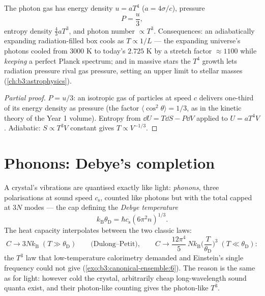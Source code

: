 \begin{proposition}\label{prop:b3:photons-phonons:thermo}
The photon gas has energy density $u = aT^4$ ($a =
4\sigma/c$), pressure
\[
P = \frac u3 ,
\]
entropy density $\tfrac43 aT^3$, and photon number $\propto T^3$.
Consequences: an adiabatically expanding radiation-filled box
cools as $T \propto 1/L$ --- the expanding universe's photons
cooled from $3000$ K to today's $2.725$ K by a stretch factor
$\approx1100$ while \emph{keeping} a perfect Planck spectrum; and
in massive stars the $T^4$ growth lets radiation pressure rival
gas pressure, setting an upper limit to stellar masses
(\cref{ch:b3:astrophysics}).
\end{proposition}

\begin{proof}[Partial proof]
$P = u/3$: an isotropic gas of particles at speed $c$ delivers
one-third of its energy density as pressure (the factor $\langle
\cos^2\theta\rangle = 1/3$, as in the kinetic theory of the Year 1
volume). Entropy from $\dd U = T\dd S - P\dd V$ applied to $U =
aT^4V$. Adiabatic: $S \propto T^3V$ constant gives $T \propto
V^{-1/3}$.
\end{proof}

\section{Phonons: Debye's completion}

\begin{theorem}\label{thm:b3:photons-phonons:debye}
A crystal's vibrations are  quantised exactly like
light: \emph{phonons}, three polarisations at sound speed
$c_{\text{s}}$, counted like photons but with the total capped at
$3N$ modes --- the cap defining the \emph{Debye temperature}
\[
k_{\text{B}}\theta_{\text{D}} = \hbar c_{\text{s}}
(6\pi^2n)^{1/3} .
\]
The heat capacity interpolates between the two classic laws:
\[
C \to 3Nk_{\text{B}} \;(T \gg \theta_{\text{D}})
\qquad\text{(Dulong--Petit)} ,
\qquad
C \to \frac{12\pi^4}{5}\,Nk_{\text{B}}
\Big(\frac{T}{\theta_{\text{D}}}\Big)^3
\;(T \ll \theta_{\text{D}}) :
\]
the $T^3$ law that low-temperature calorimetry demanded and
Einstein's single frequency could not give
(\cref{exo:b3:canonical-ensemble:6}). The reason is the same as
for light: however cold the crystal, arbitrarily cheap
long-wavelength sound quanta exist, and their photon-like counting
gives the photon-like $T^3$.
\end{theorem}

